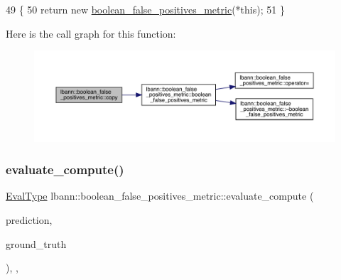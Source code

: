 \begin{DoxyCode}
49                                                         \{
50     \textcolor{keywordflow}{return} \textcolor{keyword}{new} \hyperlink{classlbann_1_1boolean__false__positives__metric_a47a4ec4bd3cd0d895f3543cd9ee0ea9b}{boolean\_false\_positives\_metric}(*\textcolor{keyword}{this});
51   \}
\end{DoxyCode}
Here is the call graph for this function\+:\nopagebreak
\begin{figure}[H]
\begin{center}
\leavevmode
\includegraphics[width=350pt]{classlbann_1_1boolean__false__positives__metric_a5d9544f3f4dc7e086cf203f5666a7660_cgraph}
\end{center}
\end{figure}
\mbox{\label{classlbann_1_1boolean__false__positives__metric_abb6573a4e32e97316c69ce9fc24214f0}} 
\subsubsection{\texorpdfstring{evaluate\+\_\+compute()}{evaluate\_compute()}}
{\footnotesize\ttfamily \hyperlink{base_8hpp_a3266f5ac18504bbadea983c109566867}{Eval\+Type} lbann\+::boolean\+\_\+false\+\_\+positives\+\_\+metric\+::evaluate\+\_\+compute (\begin{DoxyParamCaption}\item[{const \hyperlink{base_8hpp_a9a697a504ae84010e7439ffec862b470}{Abs\+Dist\+Mat} \&}]{prediction,  }\item[{const \hyperlink{base_8hpp_a9a697a504ae84010e7439ffec862b470}{Abs\+Dist\+Mat} \&}]{ground\+\_\+truth }\end{DoxyParamCaption})\hspace{0.3cm}{\ttfamily [override]}, {\ttfamily [protected]}, {\ttfamily [virtual]}}

